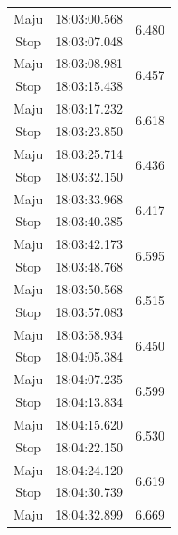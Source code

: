 \begin{longtable}{|c|c|c|}
  Maju           & 18:03:00.568        & \multirow{2}{*}{6.480}  \\ \cline{1-2}
  Stop           & 18:03:07.048        &                         \\ \hline
  Maju           & 18:03:08.981        & \multirow{2}{*}{6.457}  \\ \cline{1-2}
  Stop           & 18:03:15.438        &                         \\ \hline
  Maju           & 18:03:17.232        & \multirow{2}{*}{6.618}  \\ \cline{1-2}
  Stop           & 18:03:23.850        &                         \\ \hline
  Maju           & 18:03:25.714        & \multirow{2}{*}{6.436}  \\ \cline{1-2}
  Stop           & 18:03:32.150        &                         \\ \hline
  Maju           & 18:03:33.968        & \multirow{2}{*}{6.417}  \\ \cline{1-2}
  Stop           & 18:03:40.385        &                         \\ \hline
  Maju           & 18:03:42.173        & \multirow{2}{*}{6.595}  \\ \cline{1-2}
  Stop           & 18:03:48.768        &                         \\ \hline
  Maju           & 18:03:50.568        & \multirow{2}{*}{6.515}  \\ \cline{1-2}
  Stop           & 18:03:57.083        &                         \\ \hline
  Maju           & 18:03:58.934        & \multirow{2}{*}{6.450}  \\ \cline{1-2}
  Stop           & 18:04:05.384        &                         \\ \hline
  Maju           & 18:04:07.235        & \multirow{2}{*}{6.599}  \\ \cline{1-2}
  Stop           & 18:04:13.834        &                         \\ \hline
  Maju           & 18:04:15.620        & \multirow{2}{*}{6.530}  \\ \cline{1-2}
  Stop           & 18:04:22.150        &                         \\ \hline
  Maju           & 18:04:24.120        & \multirow{2}{*}{6.619}  \\ \cline{1-2}
  Stop           & 18:04:30.739        &                         \\ \hline
  Maju           & 18:04:32.899        & \multirow{2}{*}{6.669}  \\ \cline{1-2}

\end{longtable}
